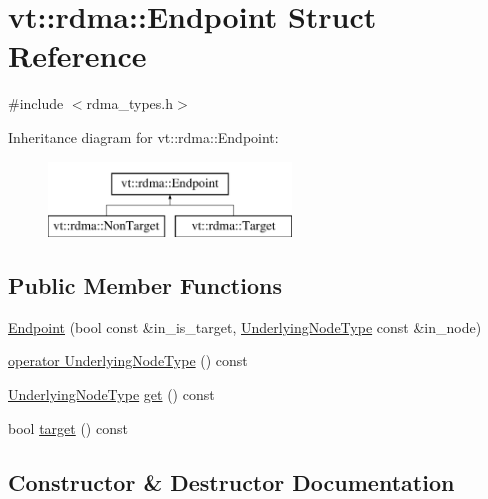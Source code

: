 \hypertarget{structvt_1_1rdma_1_1_endpoint}{}\section{vt\+:\+:rdma\+:\+:Endpoint Struct Reference}
\label{structvt_1_1rdma_1_1_endpoint}


{\ttfamily \#include $<$rdma\+\_\+types.\+h$>$}

Inheritance diagram for vt\+:\+:rdma\+:\+:Endpoint\+:\begin{figure}[H]
\begin{center}
\leavevmode
\includegraphics[height=2.000000cm]{structvt_1_1rdma_1_1_endpoint}
\end{center}
\end{figure}
\subsection*{Public Member Functions}
\begin{DoxyCompactItemize}
\item 
\hyperlink{structvt_1_1rdma_1_1_endpoint_a86219af1b6b52cf394085afb2b2d0f12}{Endpoint} (bool const \&in\+\_\+is\+\_\+target, \hyperlink{namespacevt_1_1rdma_a20d01bc82b95453c162d4b9857a4a78a}{Underlying\+Node\+Type} const \&in\+\_\+node)
\item 
\hyperlink{structvt_1_1rdma_1_1_endpoint_a5ef52e7373b28cecdd240f91eb5b5cc4}{operator Underlying\+Node\+Type} () const
\item 
\hyperlink{namespacevt_1_1rdma_a20d01bc82b95453c162d4b9857a4a78a}{Underlying\+Node\+Type} \hyperlink{structvt_1_1rdma_1_1_endpoint_a1eb7530a3e8dc1c223a3b806922ad734}{get} () const
\item 
bool \hyperlink{structvt_1_1rdma_1_1_endpoint_a6ef942569868488e455a581a8c81a250}{target} () const
\end{DoxyCompactItemize}


\subsection{Constructor \& Destructor Documentation}
\mbox{\label{structvt_1_1rdma_1_1_endpoint_a86219af1b6b52cf394085afb2b2d0f12}} 
